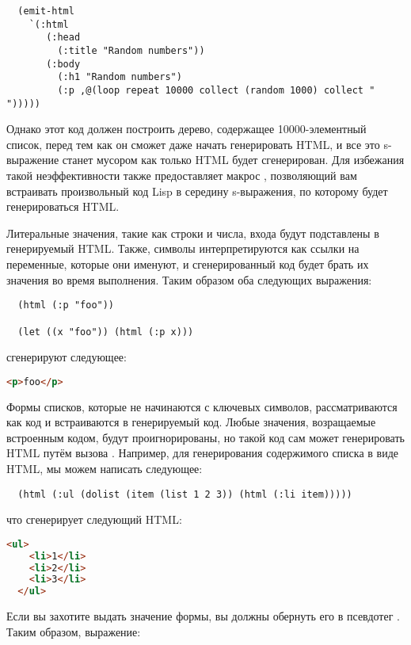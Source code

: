 \begin{lstlisting}
  (emit-html
    `(:html
       (:head
         (:title "Random numbers"))
       (:body 
         (:h1 "Random numbers")
         (:p ,@(loop repeat 10000 collect (random 1000) collect " ")))))
\end{lstlisting}

Однако этот код должен построить дерево, содержащее 10000-элементный список, перед тем как
он сможет даже начать генерировать HTML, и все это s-выражение станет мусором как только
HTML будет сгенерирован. Для избежания такой неэффективности  также
предоставляет макрос , позволяющий вам встраивать произвольный код Lisp в
середину s-выражения, по которому будет генерироваться HTML.

Литеральные значения, такие как строки и числа, входа  будут подставлены в
генерируемый HTML. Также, символы интерпретируются как ссылки на переменные, которые они
именуют, и сгенерированный код будет брать их значения во время выполнения. Таким образом
оба следующих выражения:

\begin{lstlisting}
  (html (:p "foo"))

  (let ((x "foo")) (html (:p x)))
\end{lstlisting}

сгенерируют следующее:

\begin{lstlisting}[language=HTML]
  <p>foo</p>
\end{lstlisting}

Формы списков, которые не начинаются с ключевых символов, рассматриваются как код и
встраиваются в генерируемый код. Любые значения, возращаемые встроенным кодом, будут
проигнорированы, но такой код сам может генерировать HTML путём вызова
. Например, для генерирования содержимого списка в виде HTML, мы можем написать
следующее:

\begin{lstlisting}
  (html (:ul (dolist (item (list 1 2 3)) (html (:li item)))))
\end{lstlisting}

что сгенерирует следующий HTML:

\begin{lstlisting}[language=HTML]
  <ul>
    <li>1</li>
    <li>2</li>
    <li>3</li>
  </ul>
\end{lstlisting}

Если вы захотите выдать значение формы, вы должны обернуть его в псевдотег
. Таким образом, выражение:

